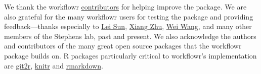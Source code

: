 \documentclass[9pt,a4paper]{extarticle}
\begin{document}
We thank the workflowr
\href{https://github.com/jdblischak/workflowr/graphs/contributors}{contributors}
for helping improve the package. We are also grateful for the many
workflowr users for testing the package and providing feedback---thanks
especially to \href{https://github.com/LSun}{Lei Sun},
\href{https://github.com/xiangzhu}{Xiang Zhu},
\href{https://github.com/NKweiwang}{Wei Wang}, and many other members of
the Stephens lab, past and present. We also acknowledge the authors and
contributors of the many great open source packages that the workflowr
package builds on. R packages particularly critical to workflowr's
implementation are
\href{https://cran.r-project.org/web/packages/git2r/index.html}{git2r},
\href{https://github.com/yihui/knitr}{knitr} and
\href{http://rmarkdown.rstudio.com/}{rmarkdown}.

{\small

}
\end{document}
